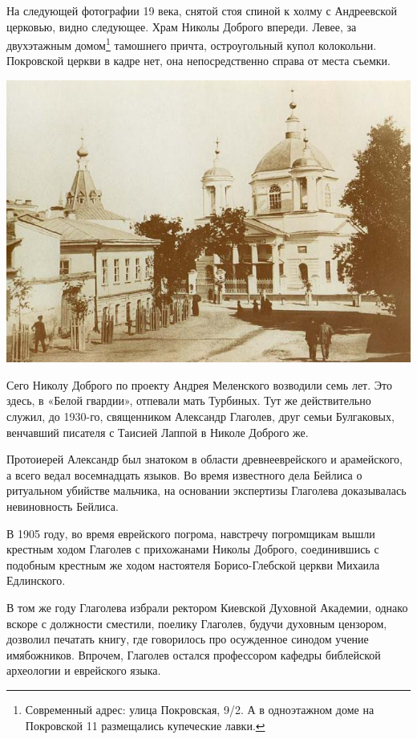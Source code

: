 На следующей фотографии 19 века, снятой стоя спиной к холму с Андреевской церковью, видно следующее. Храм Николы Доброго впереди. Левее, за двухэтажным домом\footnote{Современный адрес: улица Покровская, 9/2. А в одноэтажном доме на Покровской 11 размещались купеческие лавки.} тамошнего причта, остроугольный купол колокольни. Покровской церкви в кадре нет, она непосредственно справа от места съемки.

\begin{center}
\includegraphics[width=\linewidth]{chast-colebanie-osnov/borichev-tok/nikola_dobry.jpg}
\end{center}

Сего Николу Доброго по проекту Андрея Меленского возводили семь лет. Это здесь, в «Белой гвардии», отпевали мать Турбиных. Тут же действительно служил, до 1930-го, священником Александр Глаголев, друг семьи Булгаковых, венчавший писателя с Таисией Лаппой в Николе Доброго же.

Протоиерей Александр был знатоком в области древнееврейского и арамейского, а всего  ведал восемнадцать языков. Во время известного дела Бейлиса о ритуальном убийстве мальчика, на основании экспертизы Глаголева доказывалась невиновность Бейлиса. 

В 1905 году, во время еврейского погрома, навстречу погромщикам вышли крестным ходом Глаголев с прихожанами Николы Доброго, соединившись с подобным крестным же ходом настоятеля Борисо-Глебской церкви Михаила Едлинского.

В том же году Глаголева избрали ректором Киевской Духовной Академии, однако вскоре с должности сместили, поелику Глаголев, будучи духовным цензором, дозволил печатать книгу, где говорилось про осужденное синодом учение имябожников. Впрочем, Глаголев остался профессором кафедры библейской археологии и еврейского языка.

